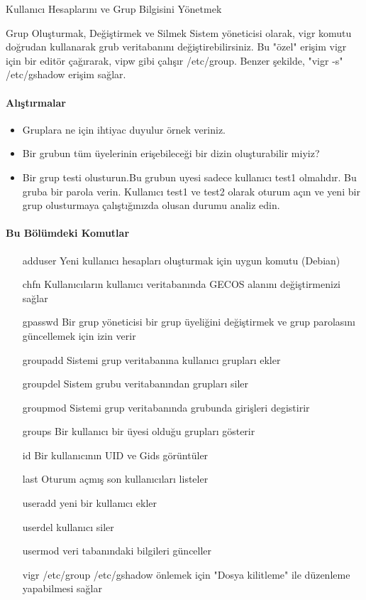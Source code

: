 \begin{section}{Kullanıcı Hesaplarını ve Grup Bilgisini Yönetmek}
\begin{subsection}{Grup Oluşturmak, Değiştirmek ve Silmek}
Sistem yöneticisi olarak, vigr komutu doğrudan kullanarak grub veritabanını değiştirebilirsiniz. Bu "özel" erişim vigr için bir editör çağırarak, vipw gibi çalışır /etc/group. Benzer şekilde, "vigr -s" /etc/gshadow erişim sağlar.

\paragraph{Alıştırmalar}{
\begin{itemize}
\item Gruplara ne için ihtiyac duyulur örnek veriniz.
\item Bir grubun tüm üyelerinin erişebileceği bir dizin oluşturabilir miyiz?
\item Bir grup testi olusturun.Bu grubun uyesi sadece kullanıcı test1 olmalıdır. Bu gruba bir parola verin. Kullanıcı test1 ve test2 olarak oturum açın ve yeni bir grup olusturmaya çalıştığınızda olusan durumu analiz edin.
\end{itemize}}
\end{subsection}

\paragraph{Bu Bölümdeki Komutlar}{
\begin{itemize}
\item[adduser]Yeni kullanıcı hesapları oluşturmak için uygun komutu (Debian)
\item[chfn]Kullanıcıların kullanıcı veritabanında GECOS alanını değiştirmenizi sağlar
\item[gpasswd]Bir grup yöneticisi bir grup üyeliğini değiştirmek ve grup parolasını güncellemek için izin verir
\item[groupadd]Sistemi grup veritabanına kullanıcı grupları ekler
\item[groupdel]Sistem grubu veritabanından grupları siler
\item[groupmod]Sistemi grup veritabanında grubunda girişleri degistirir
\item[groups]Bir kullanıcı bir üyesi olduğu grupları gösterir
\item[id]Bir kullanıcının UID ve Gids görüntüler
\item[last]Oturum açmış son kullanıcıları listeler
\item[useradd]yeni bir kullanıcı ekler
\item[userdel]kullanıcı siler
\item[usermod]veri tabanındaki bilgileri günceller
\item[vigr]/etc/group /etc/gshadow önlemek için "Dosya kilitleme" ile düzenleme yapabilmesi sağlar
\end{itemize}}


\end{section}
